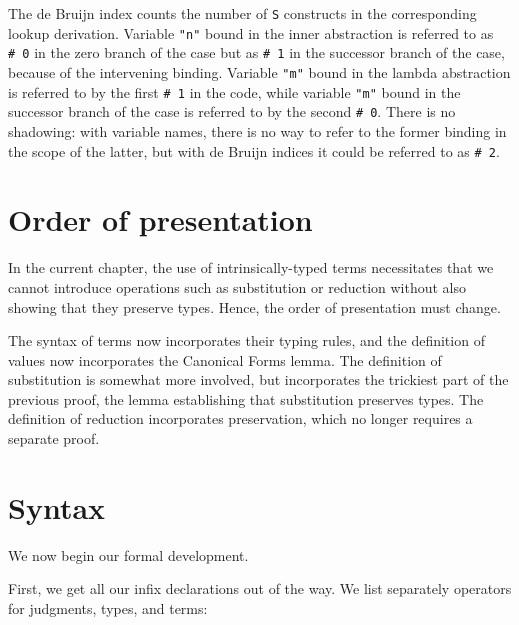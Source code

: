 The de Bruijn index counts the number of \texttt{S} constructs in the
corresponding lookup derivation. Variable \texttt{"n"} bound in the
inner abstraction is referred to as \texttt{\#\ 0} in the zero branch of
the case but as \texttt{\#\ 1} in the successor branch of the case,
because of the intervening binding. Variable \texttt{"m"} bound in the
lambda abstraction is referred to by the first \texttt{\#\ 1} in the
code, while variable \texttt{"m"} bound in the successor branch of the
case is referred to by the second \texttt{\#\ 0}. There is no shadowing:
with variable names, there is no way to refer to the former binding in
the scope of the latter, but with de Bruijn indices it could be referred
to as \texttt{\#\ 2}.

\hypertarget{order-of-presentation}{%
\section{Order of presentation}\label{order-of-presentation}}

In the current chapter, the use of intrinsically-typed terms
necessitates that we cannot introduce operations such as substitution or
reduction without also showing that they preserve types. Hence, the
order of presentation must change.

The syntax of terms now incorporates their typing rules, and the
definition of values now incorporates the Canonical Forms lemma. The
definition of substitution is somewhat more involved, but incorporates
the trickiest part of the previous proof, the lemma establishing that
substitution preserves types. The definition of reduction incorporates
preservation, which no longer requires a separate proof.

\hypertarget{syntax}{%
\section{Syntax}\label{syntax}}

We now begin our formal development.

First, we get all our infix declarations out of the way. We list
separately operators for judgments, types, and terms:

